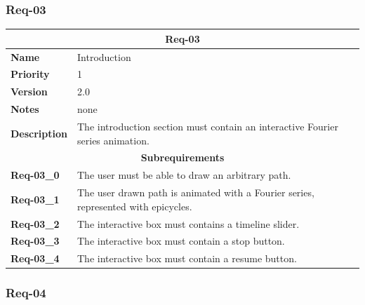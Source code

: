 \documentclass{article}
\begin{document}
\subsubsection{Req-03}

\bgroup{}
\def\arraystretch{1.25}
\begin{center}
    \begin{tabular}{ |l|p{9cm}| }
        \hline
        \multicolumn{2}{|c|}{\textbf{Req-03}} \\
        \hline
        \textbf{Name} & Introduction \\
        \hline
        \textbf{Priority} & 1 \\
        \hline
        \textbf{Version} & 2.0 \\
        \hline
        \textbf{Notes} & none \\
        \hline
        \textbf{Description}
        & The introduction section must contain an interactive Fourier series animation. \\
        \hline
        \multicolumn{2}{|c|}{\textbf{Subrequirements}} \\
        \hline
        \textbf{Req-03\_0} & The user must be able to draw an arbitrary path. \\
        \hline
        \textbf{Req-03\_1} & The user drawn path is animated with a Fourier series, represented with epicycles. \\
        \hline
        \textbf{Req-03\_2} & The interactive box must contains a timeline slider. \\
        \hline
        \textbf{Req-03\_3} & The interactive box must contain a stop button. \\
        \hline
        \textbf{Req-03\_4} & The interactive box must contain a resume button. \\
        \hline
    \end{tabular}
\end{center}
\egroup{}

\subsubsection{Req-04}
\end{document}
